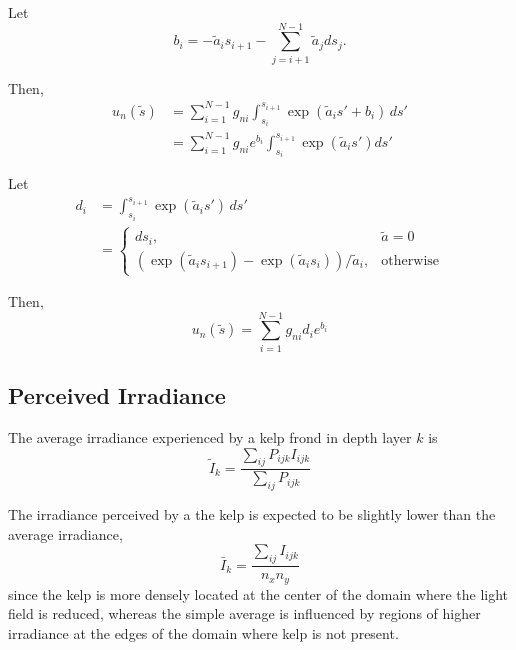 Let
\begin{equation}
  b_i = -\tilde{a}_{i}s_{i+1} - \sum_{j=i+1}^{N-1}\tilde{a}_{j}ds_j.
\end{equation}

Then,
\begin{align}
  u_n(\tilde{s}) &= \sum_{i=1}^{N-1}g_{ni}\int_{s_i}^{s_{i+1}}  \exp\left(\tilde{a}_{i}s' + b_i\right)\, ds' \\
                 &= \sum_{i=1}^{N-1}g_{ni}e^{b_i}\int_{s_i}^{s_{i+1}}  \exp\left(\tilde{a}_{i}s'\right) ds'
\end{align}

Let
\begin{align}
  d_i &= \int_{s_i}^{s_{i+1}}  \exp\left(\tilde{a}_{i}s'\right)\, ds' \\
    &= \begin{cases}
    ds_i, & \tilde{a} = 0 \\
      \left( \exp(\tilde{a}_i s_{i+1}) - \exp(\tilde{a}_i s_i) \right)/\tilde{a}_i, & \mbox{otherwise}
    \end{cases}
\end{align}

Then,
\begin{equation}
  u_n(\tilde{s}) = \sum_{i=1}^{N-1} g_{ni}d_i e^{b_i}
\end{equation}

\subsection{Perceived Irradiance}
\label{sec:perceived_irrad}

The average irradiance experienced by a kelp frond in depth layer $k$ is
\newcommand{\Iperk}{\tilde{I}_k}
\begin{equation}
   \Iperk = \frac{\sum_{ij}P_{ijk}I_{ijk}}{\sum_{ij}P_{ijk}}
\end{equation}

The irradiance perceived by a the kelp is expected to be slightly lower than the average irradiance,
\begin{equation}
  \bar{I}_k = \frac{\sum_{ij}I_{ijk}}{n_x n_y}
\end{equation}
since the kelp is more densely located at the center of the domain where the light field is reduced,
whereas the simple average is influenced by regions of higher irradiance at the edges of the domain where kelp is not present.
